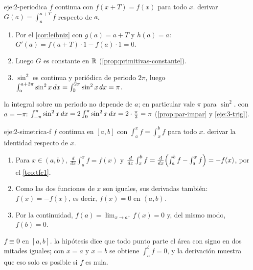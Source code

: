 \begin{solucion}{eje:2-periodica}
\datos $f$ continua con $f(x+T)=f(x)$ para todo $x$.
\planteamiento derivar $G(a)=\int_a^{a+T}f$ respecto de $a$.
\pasos
\begin{enumerate}[label=\arabic*.]
  \item Por el \cref{cor:leibniz} con $g(a)=a+T$ y $h(a)=a$: $G'(a)=f(a+T)\cdot1-f(a)\cdot1=0$.
  \item Luego $G$ es constante en $\mathbb{R}$ (\cref{prop:primitivas-constante}).
  \item $\sin^{2}$ es continua y periódica de periodo $2\pi$, luego $\int_a^{a+2\pi}\sin^{2}x\mathop{}\!d x=\int_0^{2\pi}\sin^{2}x\mathop{}\!d x=\pi$.
\end{enumerate}
\resultado la integral sobre un periodo no depende de $a$; en particular vale $\pi$ para $\sin^{2}$.
\comprobacion con $a=-\pi$: $\int_{-\pi}^{\pi}\sin^{2}x\mathop{}\!d x=2\int_0^{\pi}\sin^{2}x\mathop{}\!d x=2\cdot\frac\pi2=\pi$ (\cref{prop:par-impar} y \cref{eje:3-trig}).
\end{solucion}

\begin{solucion}{eje:2-simetrica-f}
\datos $f$ continua en $[a,b]$ con $\int_a^{x}f=\int_x^{b}f$ para todo $x$.
\planteamiento derivar la identidad respecto de $x$.
\pasos
\begin{enumerate}[label=\arabic*.]
  \item Para $x\in(a,b)$, $\frac{d}{dx}\int_a^{x}f=f(x)$ y $\frac{d}{dx}\int_x^{b}f=\frac{d}{dx}\Bigl(\int_a^{b}f-\int_a^{x}f\Bigr)=-f(x)$, por el \cref{teo:tfc1}.
  \item Como las dos funciones de $x$ son iguales, sus derivadas también: $f(x)=-f(x)$, es decir, $f(x)=0$ en $(a,b)$.
  \item Por la continuidad, $f(a)=\lim_{x\to a^{+}}f(x)=0$ y, del mismo modo, $f(b)=0$.
\end{enumerate}
\resultado $f\equiv0$ en $[a,b]$.
\comprobacion la hipótesis dice que todo punto parte el área con signo en dos mitades iguales; con $x=a$ y $x=b$ se obtiene $\int_a^bf=0$, y la derivación muestra que eso solo es posible si $f$ es nula.
\end{solucion}

